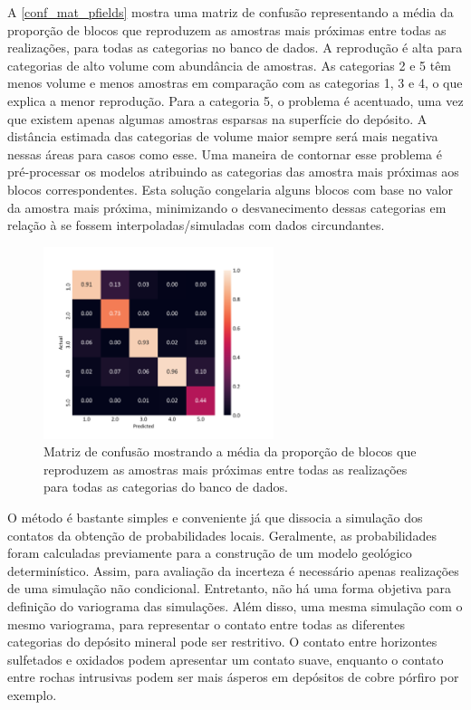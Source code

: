 A \autoref{conf_mat_pfields} mostra uma matriz de confusão representando a média da proporção de blocos que reproduzem as amostras mais próximas entre todas as realizações, para todas as categorias no banco de dados. A reprodução é alta para categorias de alto volume com abundância de amostras. As categorias 2 e 5 têm menos volume e menos amostras em comparação com as categorias 1, 3 e 4, o que explica a menor reprodução. Para a categoria 5, o problema é acentuado, uma vez que existem apenas algumas amostras esparsas na superfície do depósito. A distância estimada das categorias de volume maior sempre será mais negativa nessas áreas para casos como esse. Uma maneira de contornar esse problema é pré-processar os modelos atribuindo as categorias das amostra mais próximas aos blocos correspondentes. Esta solução congelaria alguns blocos com base no valor da amostra mais próxima, minimizando o desvanecimento dessas categorias em relação à se fossem interpoladas/simuladas com dados circundantes.

\begin{figure}[H]
	\caption{\label{conf_mat_pfields} Matriz de confusão mostrando a média da proporção de blocos que reproduzem as amostras mais próximas entre todas as realizações para todas as categorias do banco de dados.}
	\centering
		\includegraphics[width=0.6\textwidth]{capitulo_3/imagens/backflag.png}
\end{figure}

O método é bastante simples e conveniente já que dissocia a simulação dos contatos da obtenção de probabilidades locais. Geralmente, as probabilidades foram calculadas previamente para a construção de um modelo geológico determinístico. Assim, para avaliação da incerteza é necessário apenas realizações de uma simulação não condicional. Entretanto, não há uma forma objetiva para definição do variograma das simulações. Além disso, uma mesma simulação com o mesmo variograma, para representar o contato entre todas as diferentes categorias do depósito mineral pode ser restritivo. O contato entre horizontes sulfetados e oxidados podem apresentar um contato suave, enquanto o contato entre rochas intrusivas podem ser mais ásperos em depósitos de cobre pórfiro por exemplo.

